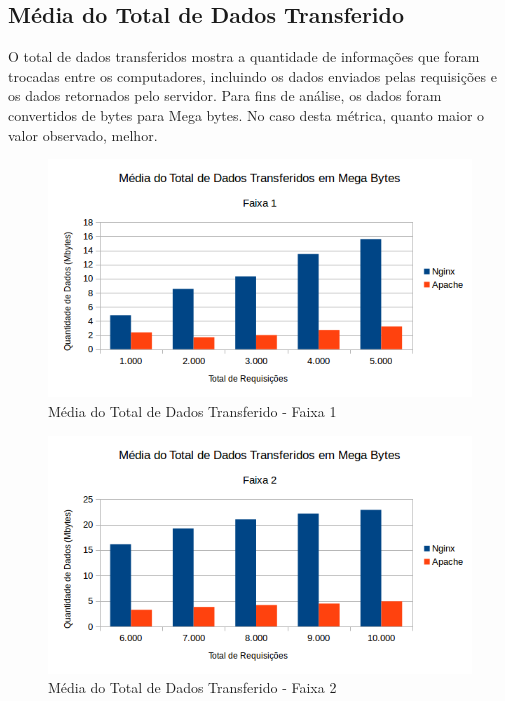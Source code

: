 \subsection{Média do Total de Dados Transferido}
O total de dados transferidos mostra a quantidade de informações que foram 
trocadas entre os computadores, incluindo os dados enviados pelas requisições e 
os dados retornados pelo servidor. Para fins de análise, os dados foram 
convertidos de bytes para Mega bytes. No caso desta métrica, quanto maior o 
valor observado, melhor.
\begin{figure}[H]
	\centering
	\includegraphics[width=1\linewidth]{graficos/grafico2-f1} 
	\caption{Média do Total de Dados Transferido - Faixa 1}
	\label{fig:grafico2-f1}
\end{figure}
\begin{figure}[H]
	\centering
	\includegraphics[width=1\linewidth]{graficos/grafico2-f2} 
	\caption{Média do Total de Dados Transferido - Faixa 2}
	\label{fig:grafico2-f2}
\end{figure}
